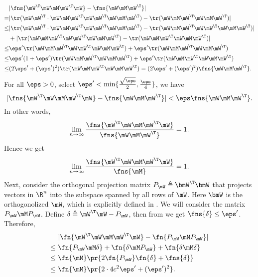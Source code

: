 \begin{equation}\begin{split}
    &|\fns{\mW^\T\mW\mM \mW^\T\mW}-\fns{\mW\mM \mW^\T}|\\
    =&|\tr(\mW\mW^\T\cdot \mW\mM \mW^\T\mW\mW^\T\mW\mM \mW^\T) - \tr(\mW\mM \mW^\T\mW\mM \mW^\T)| \\
    \leq&|\tr(\mW\mW^\T\cdot \mW\mM \mW^\T\mW\mW^\T\mW\mM \mW^\T) - \tr(\mW\mM \mW^\T\mW\mW^\T\mW\mM \mW^\T)|\\
    &+|\tr(\mW\mM \mW^\T\mW\mW^\T\mW\mM \mW^\T) - \tr(\mW\mM \mW^\T\mW\mM \mW^\T)|\\
    \leq&\eps'\tr(\mW\mM \mW^\T\mW\mW^\T\mW\mM \mW^\T)+\eps'\tr(\mW\mM \mW^\T\mW\mM \mW^\T)\\
    \leq&\eps'(1+\eps')\tr(\mW\mM \mW^\T\mW\mM \mW^\T)+\eps'\tr(\mW\mM \mW^\T\mW\mM \mW^\T)\\
    \leq&(2\eps'+(\eps')^2)\tr(\mW\mM \mW^\T\mW\mM \mW^\T) = (2\eps'+(\eps')^2)\fns{\mW\mM \mW^\T}.
\end{split}\end{equation}
For all $\eps>0$, select $\eps'<\min\{\frac{\sqrt{\eps}}{2},\frac{\eps}{4}\}$, we have
\begin{equation}
    |\fns{\mW^\T\mW\mM \mW^\T\mW}-\fns{\mW\mM \mW^\T}|<\eps \fns{\mW\mM \mW^\T}.
\end{equation}
In other words,
\begin{equation}
    \lim_{n\to\infty}\frac{\fns{\mW^\T\mW\mM \mW^\T\mW}}{\fns{\mW\mM \mW^\T}}=1.
\end{equation}
Hence we get
\begin{equation}
    \lim_{n\to\infty}\frac{\fns{\mW^\T\mW\mM \mW^\T\mW}}{\fns{\mM }}=1.
\end{equation}
Next, consider the orthogonal projection matrix $P_\mW \triangleq \bmW^\T\bmW$ that projects vectors in $\R^n$ into the subspace spanned by all rows of $\mW$. Here $\bmW$ is the orthogonolized $\mW$, which is explicitly defined in .
We will consider the matrix $P_\mW\mM P_\mW$. Define $\delta\triangleq \mW^\T\mW-P_\mW$, then from  we get $\fns{\delta}\leq\eps'$. Therefore,
\begin{equation}\begin{split}
    &|\fn{\mW^\T\mW\mM \mW^\T\mW} - \fn{P_\mW\mM P_\mW}|\\
    \leq\ &\fn{P_\mW\mM \delta} + \fn{\delta \mM P_\mW} + \fn{\delta \mM \delta}\\
    \leq\ &\fn{\mM }\pr{2\fn{P_\mW}\fn{\delta}+\fns{\delta}}\\
    \leq\ &\fn{\mM }\pr{2\cdot 4c^2\eps'+(\eps')^2}.
\end{split}\end{equation}
